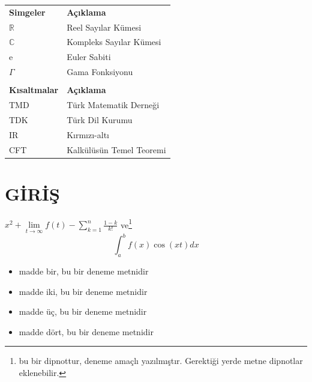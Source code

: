 \documentclass[
oneside, %
doktora, %
]{aufbetez} %
\begin{document}
\begin{simgelerdizini}
	\begin{table}[htbp]
		\doublespacing
			\begin{tabular}{l@{\hskip 4.5cm}l}
				\textbf{Simgeler} & \textbf{Açıklama}                \\
				$\mathbb{R}$        & Reel Sayılar Kümesi     \\
				$\mathbb{C}$        & Kompleks Sayılar Kümesi \\
				e        & Euler Sabiti            \\
				$\Gamma$    & Gama Fonksiyonu        \\
				&\\
				\textbf{Kısaltmalar} & \textbf{Açıklama}                \\
				TMD        & Türk Matematik Derneği     \\
				TDK        & Türk Dil Kurumu \\
				IR        & Kırmızı-altı            \\
				CFT    & Kalkülüsün Temel Teoremi        
			\end{tabular}%
	\end{table}
\end{simgelerdizini}












\mainmatter%











\chapter{GİRİŞ}
\lipsum[1] $x^2+\lim\limits_{t\to\infty}f(t)-\sum_{k=1}^{n}\frac{1-k}{k!}$ ve\footnote{bu bir dipnottur, deneme amaçlı yazılmıştır. Gerektiği yerde metne dipnotlar eklenebilir.} $$\int_{a}^{b}f(x)\cos(xt)dx$$
\begin{itemize}
	\item madde bir, bu bir deneme metnidir
	\item madde iki, bu bir deneme metnidir
	\item madde üç, bu bir deneme metnidir
	\item madde dört, bu bir deneme metnidir
\end{itemize}
\end{document}
